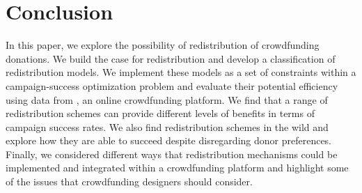 \section{Conclusion}

In this paper, we explore the possibility of redistribution of crowdfunding donations. We build the case for redistribution and develop a classification of redistribution models. We implement these models as a set of constraints within a campaign-success optimization problem and evaluate their potential efficiency using data from \lag, an online crowdfunding platform. We find that a range of redistribution schemes can provide different levels of benefits in terms of campaign success rates. We also find redistribution schemes in the wild and explore how they are able to succeed despite disregarding donor preferences. Finally, we considered different ways that redistribution mechanisms could be implemented and integrated within a crowdfunding platform and highlight some of the issues that crowdfunding designers should consider.